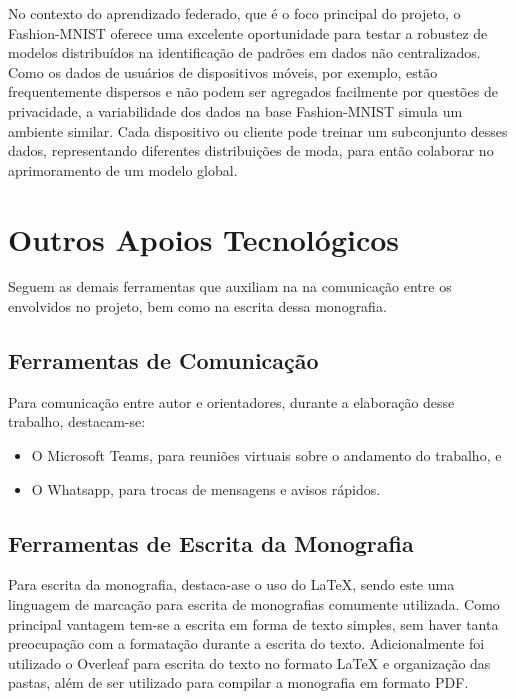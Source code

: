 No contexto do aprendizado federado, que é o foco principal do projeto, o Fashion-MNIST oferece uma excelente oportunidade para testar a robustez de modelos distribuídos na identificação de padrões em dados não centralizados. Como os dados de usuários de dispositivos móveis, por exemplo, estão frequentemente dispersos e não podem ser agregados facilmente por questões de privacidade, a variabilidade dos dados na base Fashion-MNIST simula um ambiente similar. Cada dispositivo ou cliente pode treinar um subconjunto desses dados, representando diferentes distribuições de moda, para então colaborar no aprimoramento de um modelo global.

\section{Outros Apoios Tecnológicos}
\label{sec:demais}

Seguem as demais ferramentas que auxiliam na na comunicação entre os envolvidos no projeto, bem como na escrita dessa monografia.

\subsection{Ferramentas de Comunicação}

Para comunicação entre autor e orientadores, durante a elaboração desse trabalho, destacam-se: 

\begin{itemize}
	\item O Microsoft Teams, para reuniões virtuais sobre o andamento do trabalho, e 
	\item O Whatsapp, para trocas de mensagens e avisos rápidos.
\end{itemize}

\subsection{Ferramentas de Escrita da Monografia}

Para escrita da monografia, destaca-ase o uso do LaTeX, sendo este uma linguagem de marcação para escrita de monografias comumente utilizada. Como principal vantagem tem-se a escrita 
em forma de texto simples, sem haver tanta preocupação com a formatação durante a escrita do texto. Adicionalmente foi utilizado o Overleaf para escrita do texto no formato LaTeX 
e organização das pastas, além de ser utilizado para compilar a monografia em formato PDF.

